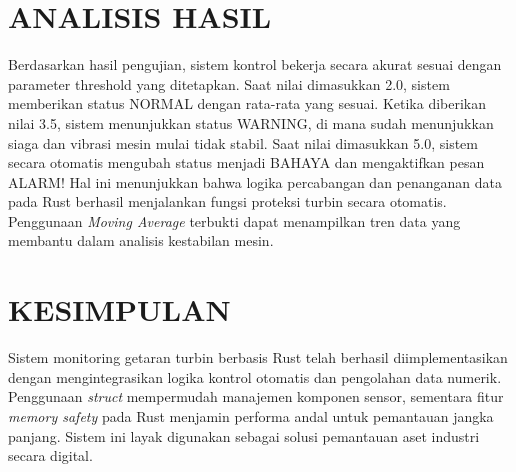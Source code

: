 \documentclass[12pt,a4paper]{article}
\begin{document}
\section{ANALISIS HASIL}
Berdasarkan hasil pengujian, sistem kontrol bekerja secara akurat sesuai dengan parameter threshold yang ditetapkan. Saat nilai dimasukkan 2.0, sistem memberikan status NORMAL dengan rata-rata yang sesuai. Ketika diberikan nilai 3.5, sistem menunjukkan status WARNING, di mana sudah menunjukkan siaga dan vibrasi mesin mulai tidak stabil. Saat nilai dimasukkan 5.0, sistem secara otomatis mengubah status menjadi BAHAYA dan mengaktifkan pesan ALARM! Hal ini menunjukkan bahwa logika percabangan dan penanganan data pada Rust berhasil menjalankan fungsi proteksi turbin secara otomatis. Penggunaan \textit{Moving Average} terbukti dapat menampilkan tren data yang membantu dalam analisis kestabilan mesin.

\section{KESIMPULAN}
Sistem monitoring getaran turbin berbasis Rust telah berhasil diimplementasikan dengan mengintegrasikan logika kontrol otomatis dan pengolahan data numerik. Penggunaan \textit{struct} mempermudah manajemen komponen sensor, sementara fitur \textit{memory safety} pada Rust menjamin performa andal untuk pemantauan jangka panjang. Sistem ini layak digunakan sebagai solusi pemantauan aset industri secara digital.
\end{document}
